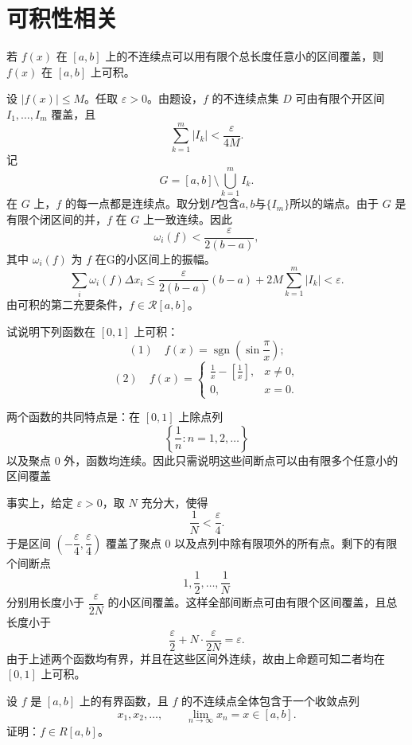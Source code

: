 \section{可积性相关}
\begin{proposition}
	若 $f(x)$ 在 $[a,b]$ 上的不连续点可以用有限个总长度任意小的区间覆盖，则 $f(x)$ 在 $[a,b]$ 上可积。
\end{proposition}

\begin{solution}
	设 $|f(x)|\leq M$。任取 $\varepsilon>0$。由题设，$f$ 的不连续点集 $D$ 可由有限个开区间 $I_1,\ldots,I_m$ 覆盖，且
	\[
	\sum_{k=1}^m |I_k|<\frac{\varepsilon}{4M}.
	\]
	记
	\[
	G=[a,b]\setminus\bigcup_{k=1}^m I_k.
	\]
	在 $G$ 上，$f$ 的每一点都是连续点。取分划$P$包含$a,b$与$\{I_m\}$所以的端点。由于 $G$ 是有限个闭区间的并，$f$ 在 $G$ 上一致连续。因此
	\[
	\omega_i(f)<\frac{\varepsilon}{2(b-a)},
	\]
	其中 $\omega_i(f)$ 为 $f$ 在G的小区间上的振幅。
	\[
	\sum_i\omega_i(f)\Delta x_i
	\leq \frac{\varepsilon}{2(b-a)}(b-a)+2M\sum_{k=1}^m |I_k|<\varepsilon.
	\]
	由可积的第二充要条件，$f\in \mathcal{R}[a,b]$。
\end{solution}


\begin{example}
	试说明下列函数在 $[0,1]$ 上可积：
	\[
	(1)\quad f(x)=\operatorname{sgn}\left(\sin\frac{\pi}{x}\right);
	\]
	\[
	(2)\quad
	f(x)=
	\begin{cases}
		\displaystyle \frac1x-\left[\frac1x\right],&x\ne0,\\[6pt]
		0,&x=0.
	\end{cases}
	\]
\end{example}


\begin{solution}
	两个函数的共同特点是：在 $[0,1]$ 上除点列
	\[
	\left\{\frac1n:n=1,2,\ldots\right\}
	\]
	以及聚点 $0$ 外，函数均连续。因此只需说明这些间断点可以由有限多个任意小的区间覆盖
	
	事实上，给定 $\varepsilon>0$，取 $N$ 充分大，使得
	\[
	\frac1N<\frac{\varepsilon}{4}.
	\]
	于是区间 $\left(-\dfrac{\varepsilon}{4},\dfrac{\varepsilon}{4}\right)$ 覆盖了聚点 $0$ 以及点列中除有限项外的所有点。剩下的有限个间断点
	\[
	1,\frac12,\ldots,\frac1N
	\]
	分别用长度小于 $\dfrac{\varepsilon}{2N}$ 的小区间覆盖。这样全部间断点可由有限个区间覆盖，且总长度小于
	\[
	\frac{\varepsilon}{2}+N\cdot\frac{\varepsilon}{2N}=\varepsilon.
	\]
	由于上述两个函数均有界，并且在这些区间外连续，故由上命题可知二者均在 $[0,1]$ 上可积。
\end{solution}
\begin{example}
	设 $f$ 是 $[a,b]$ 上的有界函数，且 $f$ 的不连续点全体包含于一个收敛点列
	\[
	x_1,x_2,\ldots,
	\qquad \lim_{n\to\infty}x_n=x\in[a,b].
	\]
	证明：$f\in R[a,b]$。
\end{example}


